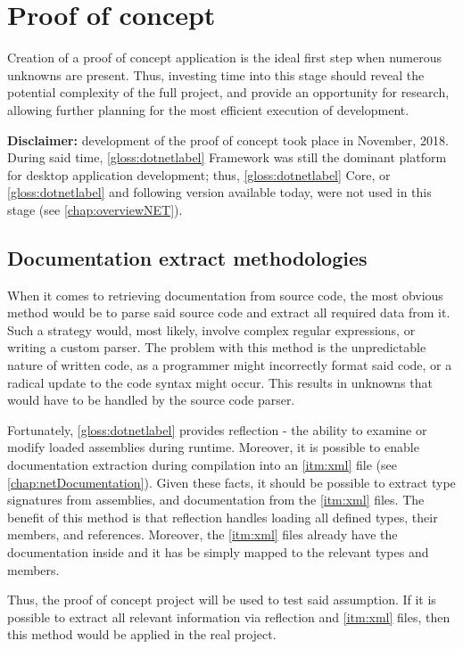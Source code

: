 \chapter{Proof of concept}

Creation of a proof of concept application is the ideal first step when numerous unknowns are present. Thus, investing time into this stage should reveal the potential complexity of the full project, and provide an opportunity for research, allowing further planning for the most efficient execution of development.

\textbf{Disclaimer:}
development of the proof of concept took place in November, 2018. During said time, \ref{gloss:dotnetlabel} Framework was still the dominant platform for desktop application development; thus, \ref{gloss:dotnetlabel} Core, or \ref{gloss:dotnetlabel} and following version available today, were not used in this stage (see \ref{chap:overviewNET}).

\section{Documentation extract methodologies}
When it comes to retrieving documentation from source code, the most obvious method would be to parse said source code and extract all required data from it. Such a strategy would, most likely, involve complex regular expressions, or writing a custom parser. The problem with this method is the unpredictable nature of written code, as a programmer might incorrectly format said code, or a radical update to the code syntax might occur. This results in unknowns that would have to be handled by the source code parser.

Fortunately, \ref{gloss:dotnetlabel} provides reflection - the ability to examine or modify loaded assemblies during runtime. Moreover, it is possible to enable documentation extraction during compilation into an \ref{itm:xml} file (see \ref{chap:netDocumentation}). Given these facts, it should be possible to extract type signatures from assemblies, and documentation from the \ref{itm:xml} files. The benefit of this method is that reflection handles loading all defined types, their members, and references. Moreover, the \ref{itm:xml} files already have the documentation inside and it has be simply mapped to the relevant types and members.

Thus, the proof of concept project will be used to test said assumption. If it is possible to extract all relevant information via reflection and \ref{itm:xml} files, then this method would be applied in the real project.

